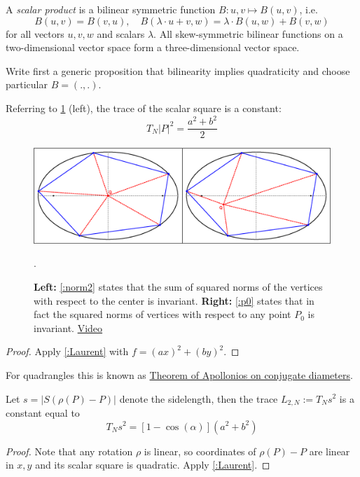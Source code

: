 A \emph{scalar product} is a bilinear symmetric function $B: u,v\mapsto B(u,v)$, i.e.
\begin{equation}
\label{eq:scalar}
B(u,v)=B(v,u),
\quad
B(λ\cdot u + v,w) = λ\cdot B(u,w) + B(v,w)
\end{equation}
for all vectors $u,v,w$ and scalars $λ$.
All skew-symmetric bilinear functions on a two-dimensional vector space
form a three-dimensional vector space.

{\color{red} Write first a generic proposition that bilinearity implies quadraticity and choose particular $B= (.,.)$.}

Referring to \cref{fig:homot_norm} (left),
the trace of the scalar square is a constant:
\begin{equation}
\label{:norm2}
T_N |P|^2 = \frac{a^2 + b^2}{2}
\end{equation}

\begin{figure}
    \centering
    \includegraphics[width=\textwidth]{pics/0025_homot_norm_no_caustic.eps}
    \caption{\textbf{Left:} \cref{:norm2} states that the sum of squared norms of the vertices with respect to the center is invariant. \textbf{Right:} \cref{:p0} states that in fact the squared norms of vertices with respect to any point $P_0$ is invariant. \href{https://youtu.be/2PdsC3CcqaE}{Video}}.
    \label{fig:homot_norm}
\end{figure}

\begin{proof}
Apply \cref{:Laurent} with $f=(ax)^2+(by)^2$.
\end{proof}
\begin{remark}
For quadrangles this is known as
\href{https://en.wikipedia.org/wiki/Ellipse#Theorem_of_Apollonios_on_conjugate_diameters}{Theorem of Apollonios on conjugate diameters}.
\end{remark}

Let $s=|S(ρ(P)-P)|$ denote the sidelength,
then the trace $L_{2,N} := T_N s^2$ is a constant equal to
\begin{equation}
\label{:sqr_si}
T_N s^2 = \left[ 1-\cos \left(α\right) \right] \left( a^2+b^2 \right)
\end{equation}
\begin{proof}
Note that any rotation $ρ$ is linear, so coordinates of $ρ(P)-P$ are linear in $x,y$
and its scalar square is quadratic. Apply \cref{:Laurent}.
\end{proof}

